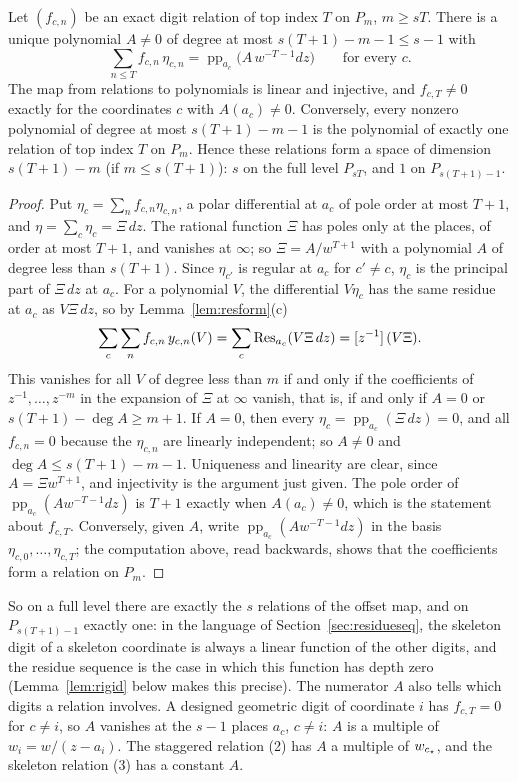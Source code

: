 \begin{lemma}\label{lem:reltype}
Let $(f_{c,n})$ be an exact digit relation of top index $T$ on $P_m$, $m\ge sT$. There is a unique polynomial $A\ne0$ of degree at most $s(T+1)-m-1\le s-1$ with
\[
\sum_{n\le T}f_{c,n}\,\eta_{c,n}=\operatorname{pp}_{a_c}\bigl(A\,w^{-T-1}dz\bigr)\qquad\text{for every }c .
\]
The map from relations to polynomials is linear and injective, and $f_{c,T}\ne0$ exactly for the coordinates $c$ with $A(a_c)\ne0$. Conversely, every nonzero polynomial of degree at most $s(T+1)-m-1$ is the polynomial of exactly one relation of top index $T$ on $P_m$. Hence these relations form a space of dimension $s(T+1)-m$ (if $m\le s(T+1)$): $s$ on the full level $P_{sT}$, and $1$ on $P_{s(T+1)-1}$.
\end{lemma}

\begin{proof}
Put $\eta_c=\sum_nf_{c,n}\eta_{c,n}$, a polar differential at $a_c$ of pole order at most $T+1$, and $\eta=\sum_c\eta_c=\Xi\,dz$. The rational function $\Xi$ has poles only at the places, of order at most $T+1$, and vanishes at $\infty$; so $\Xi =A/w^{T+1}$ with a polynomial $A$ of degree less than $s(T+1)$. Since $\eta_{c'}$ is regular at $a_c$ for $c'\ne c$, $\eta_c$ is the principal part of $\Xi\,dz$ at $a_c$. For a polynomial $V$, the differential $V\eta_c$ has the same residue at $a_c$ as $V\Xi\,dz$, so by Lemma~\ref{lem:resform}(c)
\[
\sum_c\sum_nf_{c,n}\,y_{c,n}(V)=\sum_c\operatorname{Res}_{a_c}(V\Xi\,dz)=[z^{-1}]\,(V\Xi).
\]
This vanishes for all $V$ of degree less than $m$ if and only if the coefficients of $z^{-1},\dots,z^{-m}$ in the expansion of $\Xi$ at $\infty$ vanish, that is, if and only if $A=0$ or $s(T+1)-\deg A\ge m+1$. If $A=0$, then every $\eta_c=\operatorname{pp}_{a_c}(\Xi\,dz)=0$, and all $f_{c,n}=0$ because the $\eta_{c,n}$ are linearly independent; so $A\ne0$ and $\deg A\le s(T+1)-m-1$. Uniqueness and linearity are clear, since $A=\Xi w^{T+1}$, and injectivity is the argument just given. The pole order of $\operatorname{pp}_{a_c}(Aw^{-T-1}dz)$ is $T+1$ exactly when $A(a_c)\ne0$, which is the statement about $f_{c,T}$. Conversely, given $A$, write $\operatorname{pp}_{a_c}(Aw^{-T-1}dz)$ in the basis $\eta_{c,0},\dots,\eta_{c,T}$; the computation above, read backwards, shows that the coefficients form a relation on $P_m$.
\end{proof}

So on a full level there are exactly the $s$ relations of the offset map, and on $P_{s(T+1)-1}$ exactly one: in the language of Section~\ref{sec:residueseq}, the skeleton digit of a skeleton coordinate is always a linear function of the other digits, and the residue sequence is the case in which this function has depth zero (Lemma~\ref{lem:rigid} below makes this precise). The numerator $A$ also tells which digits a relation involves. A designed geometric digit of coordinate $i$ has $f_{c,T}=0$ for $c\ne i$, so $A$ vanishes at the $s-1$ places $a_c$, $c\ne i$: $A$ is a multiple of $w_i=w/(z-a_i)$. The staggered relation (2) has $A$ a multiple of $w_{c_{\star}}$, and the skeleton relation (3) has a constant $A$.

